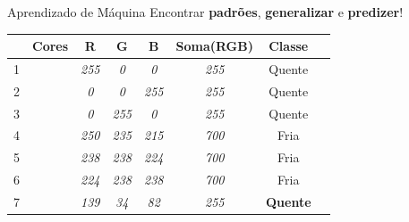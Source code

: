   \begin{frame}[fragile]{Aprendizado de Máquina}
    \centering
    Encontrar \textbf{padrões}, \textbf{generalizar} e \textbf{predizer}!
    \begin{table}[]
    \centering
    \label{my-label}
    \begin{tabular}{l|c|c|c|c|c|c|c|}
    \cline{2-7}
                            & \textbf{Cores}           & \textbf{R}   & \textbf{G}   & \textbf{B}   & \multicolumn{1}{l|}{\textbf{Soma(RGB)}} & \textbf{Classe} \\ \hline
    \multicolumn{1}{|l|}{1} & \cellcolor[HTML]{FF0000} & \textit{255} & \textit{0}   & \textit{0}   & \textit{255}                       & Quente          \\ \hline
    \multicolumn{1}{|l|}{2} & \cellcolor[HTML]{0000FF} & \textit{0}   & \textit{0}   & \textit{255} & \textit{255}                       & Quente          \\ \hline
    \multicolumn{1}{|l|}{3} & \cellcolor[HTML]{00FF00} & \textit{0}   & \textit{255} & \textit{0}   & \textit{255}                       & Quente          \\ \hline
    \multicolumn{1}{|l|}{4} & \cellcolor[HTML]{FAEBD7} & \textit{250} & \textit{235} & \textit{215} & \textit{700}                       & Fria            \\ \hline
    \multicolumn{1}{|l|}{5} & \cellcolor[HTML]{EEEEE0} & \textit{238} & \textit{238} & \textit{224} & \textit{700}                       & Fria            \\ \hline
    \multicolumn{1}{|l|}{6} & \cellcolor[HTML]{E0EEEE} & \textit{224} & \textit{238} & \textit{238} & \textit{700}                       & Fria            \\ \hline
    \multicolumn{1}{|l|}{7} & \cellcolor[HTML]{8B2252} & \textit{139} & \textit{34}  & \textit{82}  & \textit{255}                       & \textbf{Quente}          \\ \hline
    \end{tabular}
    \end{table}
  \end{frame}

